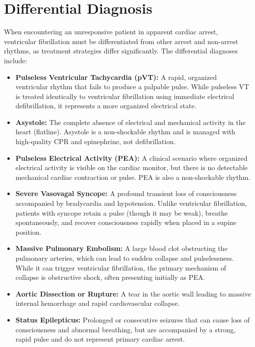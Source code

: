 \section*{Differential Diagnosis}
When encountering an unresponsive patient in apparent cardiac arrest, ventricular fibrillation must be differentiated from other arrest and non-arrest rhythms, as treatment strategies differ significantly.
The differential diagnoses include:
\begin{itemize}
    \item \textbf{Pulseless Ventricular Tachycardia (pVT):} A rapid, organized ventricular rhythm that fails to produce a palpable pulse. While pulseless VT is treated identically to ventricular fibrillation using immediate electrical defibrillation, it represents a more organized electrical state.
    \item \textbf{Asystole:} The complete absence of electrical and mechanical activity in the heart (flatline). Asystole is a non-shockable rhythm and is managed with high-quality CPR and epinephrine, not defibrillation.
    \item \textbf{Pulseless Electrical Activity (PEA):} A clinical scenario where organized electrical activity is visible on the cardiac monitor, but there is no detectable mechanical cardiac contraction or pulse. PEA is also a non-shockable rhythm.
    \item \textbf{Severe Vasovagal Syncope:} A profound transient loss of consciousness accompanied by bradycardia and hypotension. Unlike ventricular fibrillation, patients with syncope retain a pulse (though it may be weak), breathe spontaneously, and recover consciousness rapidly when placed in a supine position.
    \item \textbf{Massive Pulmonary Embolism:} A large blood clot obstructing the pulmonary arteries, which can lead to sudden collapse and pulselessness. While it can trigger ventricular fibrillation, the primary mechanism of collapse is obstructive shock, often presenting initially as PEA.
    \item \textbf{Aortic Dissection or Rupture:} A tear in the aortic wall leading to massive internal hemorrhage and rapid cardiovascular collapse.
    \item \textbf{Status Epilepticus:} Prolonged or consecutive seizures that can cause loss of consciousness and abnormal breathing, but are accompanied by a strong, rapid pulse and do not represent primary cardiac arrest.
\end{itemize}


